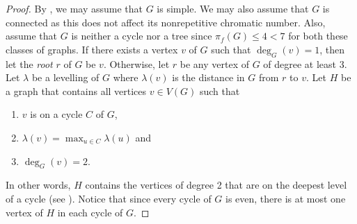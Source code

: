 \documentclass{patmorin}
\begin{document}
\begin{proof}
 By , we may assume that $G$ is simple.  We may also
 assume that $G$ is connected as this does not affect its nonrepetitive
 chromatic number. Also, assume that $G$ is neither a cycle nor a
 tree since $\pi_f(G) \leq 4 < 7$ for both these classes of graphs.
 If there exists a vertex $v$ of $G$ such that $\deg_G(v)=1$, then let
 the \emph{root} $r$ of $G$ be $v$. Otherwise, let $r$ be any vertex
 of $G$ of degree at least $3$. Let $\lambda$ be a levelling of $G$
 where $\lambda(v)$ is the distance in $G$ from $r$ to $v$. Let $H$
 be a graph that contains all vertices $v\in V(G)$ such that
 \begin{enumerate}
  \item $v$ is on a cycle $C$ of $G$,
  \item $\lambda(v)=\max_{u \in C} \lambda(u)$ and
  \item $\deg_G(v)=2$.
 \end{enumerate} 
 In other words, $H$ contains the vertices of degree 2 that are on the
 deepest level of a cycle (see ). Notice that
 since every cycle of $G$ is even, there is at most one vertex of $H$
 in each cycle of $G$.


\end{proof}
\end{document}
